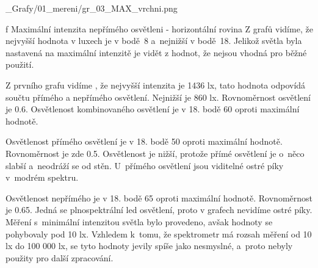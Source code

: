 \medskip {}
\picw=15cm _Grafy/01_mereni/gr_03_MAX_vrchni.png
\caption/f Maximální intenzita nepřímého osvětleni - horizontální rovina
\medskip
Z grafů vidíme, že nejvyšší hodnota v luxech je v bodě~8 a~nejnižší v bodě~18. Jelikož světla byla nastavená na maximální intenzitě
je vidět z hodnot, že nejsou vhodná pro běžné použití.

Z prvního grafu vidíme , že nejvyšší intenzita je 1436 lx, tato hodnota odpovídá součtu přímého a nepřímého osvětlení. Nejnižší je
860 lx. Rovnoměrnost osvětlení je 0.6. Osvětlenost kombinovaného osvětlení je v 18. bodě {60\pcent} oproti maximální hodnotě.

Osvětlenost přímého osvětlení je v 18. bodě {50\pcent}  oproti maximální hodnotě. Rovnoměrnost je zde 0.5. Osvětlenost je nižší, protože přímé osvětlení
je o~něco slabší a~neodráží se od stěn. U~přímého osvětlení jsou viditelné ostré píky v~modrém spektru.

Osvětlenost nepřímého je v 18. bodě {65\pcent}  oproti maximální hodnotě. Rovnoměrnost je 0.65. Jedná se plnospektrální led osvětlení, proto v grafech
nevidíme ostré píky.
\medskip
Měření s~minimální intenzitou světla bylo provedeno, avšak hodnoty se pohybovaly pod 10 lx. Vzhledem k~tomu,
že spektrometr má rozsah měření od 10 lx do 100 000 lx, se tyto hodnoty jevily spíše jako nesmyslné, a~proto
nebyly použity pro další zpracování.



